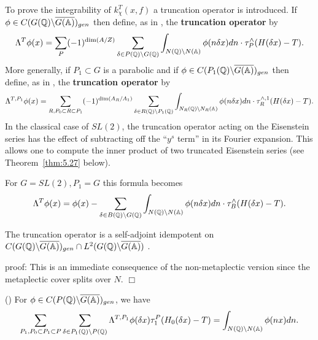 To prove the integrability of $k_\chi ^T(x,f)$ a truncation operator is
introduced.
If $\phi \in C(G(\mathbb{Q} )\backslash \overline{G(\mathbb{A} )})_{gen}$
then define,
as in \cite[p 89]{A3}, the \textbf{truncation operator} by 
\begin{equation}\label{eq:5.14}
\Lambda ^T\phi (x)
=\sum_P(-1)^{\dim (A/Z)}
\sum_{\delta \in P(\mathbb{Q} )\backslash G(\mathbb{Q} )}
\int_{N(\mathbb{Q} )\backslash N(\mathbb{A} )}\phi (n\delta
x)dn\cdot \tau _P^{\wedge }(H(\delta x)-T).
\end{equation}
More generally, if $P_1\subset G$ is a parabolic and if
$\phi \in C(P_1(\mathbb{Q} )\backslash \overline{G(\mathbb{A} )})_{gen}$ then
define, as in \cite[p 97]{A3}, the \textbf{truncation operator} by 
\begin{equation}\label{eq:5.15}
\Lambda ^{T,P_1}\phi (x)
=\sum_{R , P_0\subset R\subset P_1}
(-1)^{\dim (A_R/A_1)}
\sum_{\delta \in R(\mathbb{Q} )\backslash P_1(\mathbb{Q} )}
\int_{N_R(\mathbb{Q} )\backslash N_R(\mathbb{A} )}
\phi (n\delta x)dn\cdot \tau_R^{\wedge ,1}(H(\delta x)-T).
\end{equation}
In the classical case of $SL(2)$, the truncation operator acting
on the Eisenstein series has the effect of subtracting
off the ``$y^s$ term'' in its Fourier expansion. This allows one 
to compute the inner product of two truncated Eisenstein series
(see Theorem~\ref{thm:5.27} below).

\begin{example}\label{ex:5.12}
For $G=SL(2),P_1=G$ this formula becomes 
\begin{equation}\label{eq:5.16}
\Lambda ^T\phi (x)=\phi (x)-\sum_{\delta \in B(\qqq )\backslash G(\qqq %
)}\int_{N(\qqq )\backslash N(\aaa )}\phi (n\delta x)dn\cdot \tau
_B^{\wedge }(H(\delta x)-T).
\end{equation}
\end{example}

\begin{lemma}\label{lem:5.13}
The truncation operator is a self-adjoint idempotent on
$C(G(\mathbb{Q} )\backslash \overline{G(\mathbb{A} )})_{gen}
\cap L^2(G(\mathbb{Q} )\backslash \overline{G(\mathbb{A} )})$ .
\end{lemma}
proof: This is an immediate consequence of the non-metaplectic
version \cite{A3} since the metaplectic cover splits over $N$. $\Box$

\begin{lemma}\label{lem:5.14}
(\cite[Lemma 1.5]{A3}) For
$\phi \in C(P(\mathbb{Q} )\backslash \overline{G(\mathbb{A} )})_{gen}$, we
have 
\[
\sum_{ P_1 , P_0\subset P_1\subset P }
\sum_{\delta \in P_1(\mathbb{Q} )\backslash P(\mathbb{Q} )}
\Lambda ^{T,P_1}\phi (\delta x)\tau _1^P(H_0(\delta x)-T)
=\int_{N(\mathbb{Q} )\backslash N(\mathbb{A} )}\phi (nx)dn.
\]
\end{lemma}

